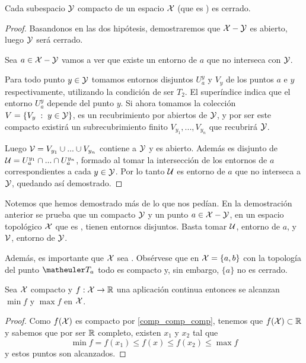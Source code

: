 \begin{prop}\label{T6:prop_compacto en t2 es cerrado}
	Cada subespacio $\mathcal{Y}$ compacto de un espacio $\mathcal{X}$ (que es \hausdorff) es cerrado.
	\begin{proof}
		Basandonos en las dos hipótesis, demostraremos que $\mathcal{X} - \mathcal{Y}$ es abierto, luego $\mathcal{Y}$ será cerrado.
		
		Sea $a \in \mathcal{X}-\mathcal{Y}$ vamos a ver que existe un entorno de $a$ que no interseca con $\mathcal{Y}$.
		
		Para todo punto $y \in \mathcal{Y}$ tomamos entornos disjuntos $U_a^y$ y $V_y$ de los puntos $a$ e $y$ respectivamente, utilizando la condición de ser $T_2$. El superíndice indica que el entorno $U_a^y$ depende del punto $y$. Si ahora tomamos la colección $V = \{V_y \;:\; y \in \mathcal{Y}\}$, es un recubrimiento por abiertos de $\mathcal{Y}$, y por ser este compacto existirá un subrecubrimiento finito $V_{y_1}, ..., V_{y_n}$ que recubrirá $\mathcal{Y}$.
		
		Luego $\mathcal{V} = V_{y_1} \cup ... \cup V_{y_n}$ contiene a $\mathcal{Y}$ y es abierto. Además es disjunto de $\mathcal{U} = U_a^{y_1} \cap ... \cap U_a^{y_n}$, formado al tomar la intersección de los entornos de $a$ correspondientes a cada $y\in\mathcal{Y}$. Por lo tanto $\mathcal{U}$ es entorno de $a$ que no interseca a $\mathcal{Y}$, quedando así demostrado.
	\end{proof}
\end{prop}

\begin{obs}\label{T6:obs_compacto y punto en t2 disjuntos}
	Notemos que hemos demostrado más de lo que nos pedían. En la demostración anterior se prueba que un compacto $\mathcal{Y}$ y un punto $a\in \mathcal{X}-\mathcal{Y}$, en un espacio topológico $\mathcal{X}$ que es \hausdorff, tienen entornos disjuntos. Basta tomar $\mathcal{U}$, entorno de $a$, y $\mathcal{V}$, entorno de $\mathcal{Y}$.
	
	Además, es importante que $\mathcal{X}$ sea \hausdorff. Obsérvese que en $\mathcal{X}=\{a,b\}$ con la topología del punto $\T_a$ todo es compacto y, sin embargo, $\{a\}$ no es cerrado.
\end{obs}

\begin{prop}\label{T6:prop_alcanza maximo y minimo}
	Sea $\mathcal{X}$ compacto y $f:\mathcal{X} \rightarrow \mathbb{R}$ una aplicación continua entonces se alcanzan $\min f$ y $\max f$ en $\mathcal{X}$.
	\begin{proof}
		Como $f(\mathcal{X})$ es compacto por \ref{comp_comp_comp}, tenemos que $f(\mathcal{X}) \subset \mathbb{R}$ y sabemos que por ser $\mathbb{R}$ completo, existen $x_1$ y $x_2$ tal que
		\begin{equation*}
			\min f = f(x_1) \leq f(x) \leq f(x_2) \leq \max f
		\end{equation*}
		y estos puntos son alcanzados.
	\end{proof}
\end{prop}

